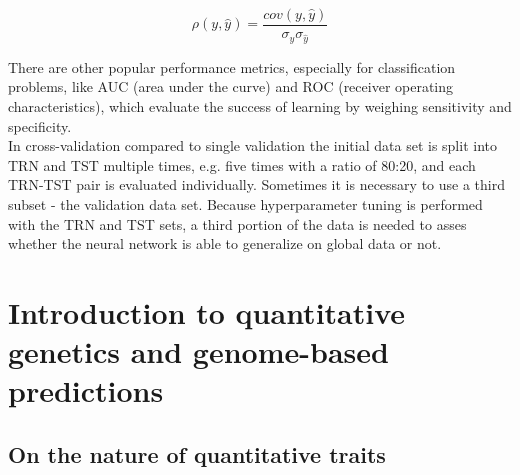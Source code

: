 \begin{equation}
  \rho(y,\hat{y}) = \frac{cov(y,\hat{y})}{ \sigma_y \sigma_{\hat{y}}}
 \label{eqn:pearson}
\end{equation}

There are other popular performance metrics, especially for classification problems, like
AUC (area under the curve) and ROC (receiver operating characteristics), which evaluate
the success of learning by weighing sensitivity and specificity. \\
In cross-validation compared to single validation the initial data set is split into TRN
and TST multiple times, e.g. five times with a ratio of 80:20, and each TRN-TST pair is
evaluated individually. Sometimes it is necessary to use a third subset - the validation
data set. Because hyperparameter tuning is performed with the TRN and TST sets, a third
portion of the data is needed to asses whether the neural network is able to generalize on
global data or not.

 

\newpage
\section{Introduction to quantitative genetics and genome-based predictions} \label{chap:gs}
\subsection{On the nature of quantitative traits} \label{quan}

